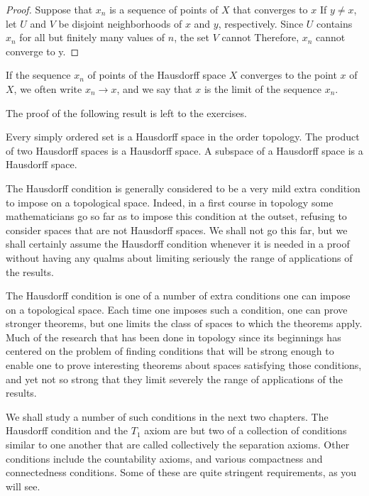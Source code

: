 \begin{proof}
 Suppose that \(x_{n}\) is a sequence of points of \(X\) that converges to \(x\) If \(y \neq x\), let \(U\) and \(V\) be disjoint neighborhoods of \(x\) and \(y\), respectively. Since \(U\) contains \(x_{n}\) for all but finitely many values of \(n\), the set \(V\) cannot Therefore, \(x_{n}\) cannot converge to y.
\end{proof}

If the sequence \(x_{n}\) of points of the Hausdorff space \(X\) converges to the point \(x\) of \(X\), we often write \(x_{n} \rightarrow x\), and we say that \(x\) is the limit of the sequence \(x_{n}\).

The proof of the following result is left to the exercises.

\begin{theorem}
\label{thm:\thetheorem}
 Every simply ordered set is a Hausdorff space in the order topology. The product of two Hausdorff spaces is a Hausdorff space. A subspace of a Hausdorff space is a Hausdorff space.
\end{theorem}

The Hausdorff condition is generally considered to be a very mild extra condition to impose on a topological space. Indeed, in a first course in topology some mathematicians go so far as to impose this condition at the outset, refusing to consider spaces that are not Hausdorff spaces. We shall not go this far, but we shall certainly assume the Hausdorff condition whenever it is needed in a proof without having any qualms about limiting seriously the range of applications of the results.

The Hausdorff condition is one of a number of extra conditions one can impose on a topological space. Each time one imposes such a condition, one can prove stronger theorems, but one limits the class of spaces to which the theorems apply. Much of the research that has been done in topology since its beginnings has centered on the problem of finding conditions that will be strong enough to enable one to prove interesting theorems about spaces satisfying those conditions, and yet not so strong that they limit severely the range of applications of the results.

We shall study a number of such conditions in the next two chapters. The Hausdorff condition and the \(T_{1}\) axiom are but two of a collection of conditions similar to one another that are called collectively the separation axioms. Other conditions include the countability axioms, and various compactness and connectedness conditions. Some of these are quite stringent requirements, as you will see.

